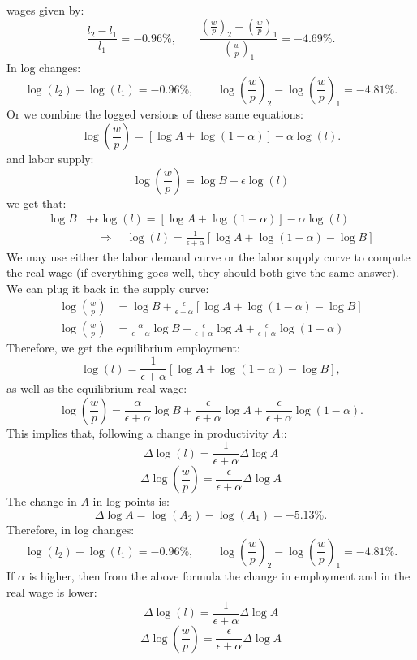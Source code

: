 \documentclass[]{book}
\begin{document}
\begin{enumerate}
  wages given by:
  \[\frac{l_2-l_1}{l_1}=-0.96\%, \qquad \frac{\left(\frac{w}{p}\right)_2-\left(\frac{w}{p}\right)_1}{\left(\frac{w}{p}\right)_1}=-4.69\%.\]
  In log changes:
  \[\log(l_2)-\log(l_1)=-0.96\%, \qquad \log\left(\frac{w}{p}\right)_2-\log\left(\frac{w}{p}\right)_1=-4.81\%.\]
  Or we combine the logged versions of these same equations:
  \[\log\left(\frac{w}{p}\right) = \left[\log A + \log(1-\alpha)\right] -\alpha \log(l).\]
  and labor supply:
  \[\log\left(\frac{w}{p}\right)=\log B + \epsilon \log(l)\] we get
  that: \[
  \begin{aligned}
  \log B &+ \epsilon \log(l) = \left[\log A + \log(1-\alpha)\right] -\alpha \log(l)\\
  & \quad \Rightarrow \quad \log(l)=\frac{1}{\epsilon + \alpha}\left[\log A + \log(1-\alpha) - \log B\right]
  \end{aligned}
  \] We may use either the labor demand curve or the labor supply curve
  to compute the real wage (if everything goes well, they should both
  give the same answer). We can plug it back in the supply curve: \[
  \begin{aligned}
  \log\left(\frac{w}{p}\right)&=\log B+\frac{\epsilon}{\epsilon + \alpha}\left[\log A + \log(1-\alpha) - \log B\right]\\
  \log\left(\frac{w}{p}\right)&=\frac{\alpha}{\epsilon+\alpha}\log B + \frac{\epsilon}{\epsilon + \alpha} \log A +\frac{\epsilon}{\epsilon + \alpha}\log(1-\alpha)
  \end{aligned}
  \] Therefore, we get the equilibrium employment:
  \[\boxed{\log(l)=\frac{1}{\epsilon + \alpha}\left[\log A + \log(1-\alpha) - \log B\right]},\]
  as well as the equilibrium real wage:
  \[\boxed{\log\left(\frac{w}{p}\right)=\frac{\alpha}{\epsilon+\alpha}\log B + \frac{\epsilon}{\epsilon + \alpha} \log A +\frac{\epsilon}{\epsilon + \alpha}\log(1-\alpha)}.\]
  This implies that, following a change in productivity \(A\)::
  \[\Delta \log(l) = \frac{1}{\epsilon+\alpha} \Delta \log A\]
  \[\Delta \log\left(\frac{w}{p}\right) = \frac{\epsilon}{\epsilon+\alpha} \Delta \log A\]
  The change in \(A\) in log points is:
  \[\Delta \log A=\log(A_2)-\log(A_1)=-5.13\%.\] Therefore, in log
  changes:
  \[\log(l_2)-\log(l_1)=-0.96\%, \qquad \log\left(\frac{w}{p}\right)_2-\log\left(\frac{w}{p}\right)_1=-4.81\%.\]
  If \(\alpha\) is higher, then from the above formula the change in
  employment and in the real wage is lower:
  \[\Delta \log(l) = \frac{1}{\epsilon+\alpha} \Delta \log A\]
  \[\Delta \log\left(\frac{w}{p}\right) = \frac{\epsilon}{\epsilon+\alpha} \Delta \log A\]

\end{enumerate}
\end{document}

